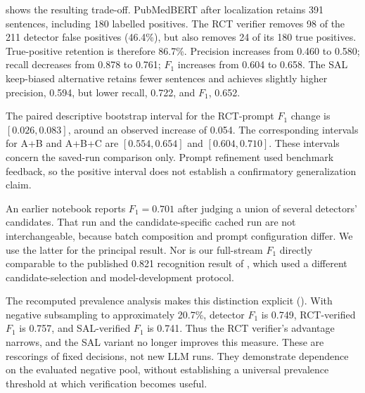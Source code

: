 \begin{table}[t]
\centering
\small
\caption{SAL stage contributions on 40 articles, with all 205 labelled positives in the recall
denominator. TP denotes retained labelled positives. Both Stage-C rows use complete cached
judgments on the same 391 PubMedBERT candidates.}
\label{T:sal-stages}

\end{table}

 shows the resulting trade-off. PubMedBERT after localization retains
391 sentences, including 180 labelled positives. The RCT verifier removes 98 of the 211 detector
false positives (46.4\%), but also removes 24 of its 180 true positives. True-positive retention
is therefore 86.7\%. Precision increases from 0.460 to 0.580; recall decreases from 0.878 to 0.761;
$F_1$ increases from 0.604 to 0.658. The SAL keep-biased alternative retains fewer sentences
and achieves slightly higher precision, 0.594, but lower recall, 0.722, and $F_1$, 0.652.

The paired descriptive bootstrap interval for the RCT-prompt $F_1$ change is
$[0.026,0.083]$, around an observed increase of 0.054. The corresponding intervals for A+B and
A+B+C are $[0.554,0.654]$ and $[0.604,0.710]$. These intervals concern the saved-run comparison
only. Prompt refinement used benchmark feedback, so the positive interval does not establish a
confirmatory generalization claim.

An earlier notebook reports $F_1=0.701$ after judging a union of several detectors' candidates.
That run and the candidate-specific cached run are not interchangeable, because batch composition
and prompt configuration differ. We use the latter for the principal result. Nor is our full-stream
$F_1$ directly comparable to the published 0.821 recognition result of
\citet{lan2024automatic}, which used a different candidate-selection and model-development protocol.

\begin{table}[t]
\centering\small
\caption{SAL prevalence sensitivity with fixed predictions/verdicts. The section pool has
203 reachable positives; matching retains them and samples 778 negatives, averaging over eight
seeds. Full-stream scores retain all 205 positives in the recall denominator.}
\label{T:prevalence}

\end{table}

The recomputed prevalence analysis makes this distinction explicit ().
With negative subsampling to approximately 20.7\%, detector $F_1$ is 0.749, RCT-verified $F_1$
is 0.757, and SAL-verified $F_1$ is 0.741. Thus the RCT verifier's advantage narrows, and the SAL
variant no longer improves this measure. These are rescorings of fixed decisions, not new LLM
runs. They demonstrate dependence on the evaluated negative pool, without establishing a
universal prevalence threshold at which verification becomes useful.

